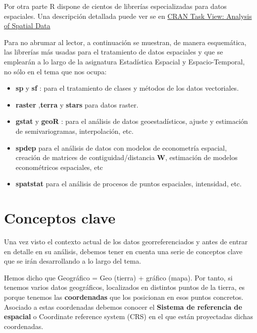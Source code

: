 \documentclass[
]{report}
\theoremstyle{definition}
\theoremstyle{definition}
\theoremstyle{definition}
\theoremstyle{definition}
\theoremstyle{remark}
\begin{document}
Por otra parte R dispone de cientos de librerías especializadas para datos
espaciales. Una descripción detallada puede ver se en \href{https://cran.r-project.org/web/views/Spatial.html}{CRAN Task View: Analysis
of Spatial Data}

Para no abrumar al lector, a continuación se muestran, de manera esquemática,
las librerías más usadas para el tratamiento de datos espaciales y que se
emplearán a lo largo de la asignatura Estadística Espacial y Espacio-Temporal,
no sólo en el tema que nos ocupa:

\begin{itemize}
\item
  \textbf{sp} \citep{R-sp} y \textbf{sf} \citep{R-sp}: para el tratamiento de clases y métodos de
  los datos vectoriales.
\item
  \textbf{raster} \citep{R-raster},\textbf{terra} \citep{R-terra}y \textbf{stars} \citep{R-stars}para datos
  raster.
\item
  \textbf{gstat} \citep{R-gstat} y \textbf{geoR} \citep{R-geor}: para el análisis de datos
  geoestadísticos, ajuste y estimación de semivariogramas, interpolación, etc.
\item
  \textbf{spdep} \citep{R-spdep} para el análisis de datos con modelos de econometría
  espacial, creación de matrices de contiguidad/distancia \textbf{W}, estimación de
  modelos econométricos espaciales, etc
\item
  \textbf{spatstat} \citep{spatstat_2005}para el análisis de procesos de puntos
  espaciales, intensidad, etc.
\end{itemize}

\hypertarget{conceptos-clave}{%
\section{Conceptos clave}\label{conceptos-clave}}

Una vez visto el contexto actual de los datos georreferenciados y antes de
entrar en detalle en su análisis, debemos tener en cuenta una serie de conceptos
clave que se irán desarrollando a lo largo del tema.

Hemos dicho que Geográfico = Geo (tierra) + gráfico (mapa). Por tanto, si
tenemos varios datos geográficos, localizados en distintos puntos de la tierra,
es porque tenemos las \textbf{coordenadas} que los posicionan en esos puntos
concretos. Asociado a estas coordenadas debemos conocer el \textbf{Sistema de
referencia de espacial} o Coordinate reference system (CRS) en el que están
proyectadas dichas coordenadas.
\end{document}
